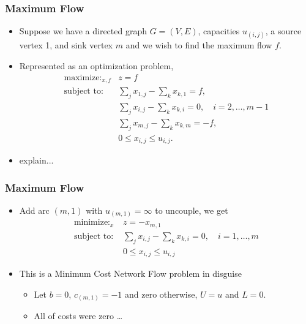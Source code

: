 \documentclass{beamer}
\begin{document}
	\begin{frame}
		\frametitle{Maximum Flow}
		\begin{itemize}
			\item Suppose we have a directed graph $G = (V, E)$, capacities $u_{(i, j)}$, a source vertex 1, and sink vertex $m$ and we wish to find the maximum flow $f$.
			\item Represented as an optimization problem,
			\begin{align*}
				\mathop{\text{maximize: }}_{x, f} &z = f\\
				\text{subject to: } &\sum_{j}x_{1, j} - \sum_{k}x_{k, 1} = f,\\
				&\sum_{j}x_{i, j} - \sum_{k}x_{k, i} = 0, \quad i = 2, \dots, m - 1\\
				&\sum_{j}x_{m, j} - \sum_{k}x_{k, m} = -f,\\
				&0 \leq x_{i, j} \leq u_{i, j}.
			\end{align*} 
			\item explain...
		\end{itemize}
		\end{frame}
			
		\begin{frame}
			\frametitle{Maximum Flow}
			\begin{itemize}
			\item Add arc $(m, 1)$ with $u_{(m, 1)} = \infty$ to uncouple, we get
			\begin{align*}
				\mathop{\text{minimize: }}_{x} &z = -x_{m, 1}\\
				\text{subject to: } &\sum_{j}x_{i, j} - \sum_{k}x_{k, i} = 0, \quad i = 1, \dots, m\\
				&0 \leq x_{i, j} \leq u_{i, j}
			\end{align*}
			\vfill
			\item This is a Minimum Cost Network Flow problem in disguise 
			\begin{itemize}
				\item Let $b = 0$, $c_{(m,1)} = -1$ and zero otherwise, $U = u$ and $L = 0$.
				
				\item All of costs were zero \dots 
			\end{itemize}
		\end{itemize}
	\end{frame}
\end{document}
